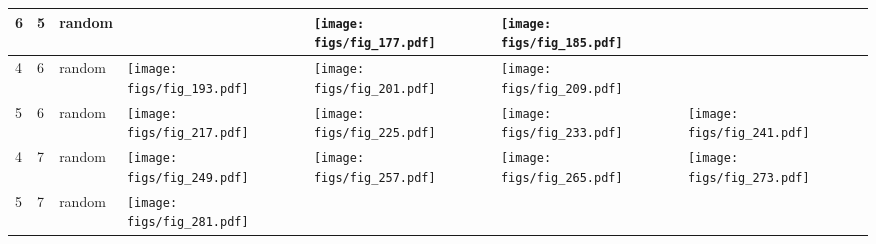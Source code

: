 \documentclass[oneside,canadian,landscape]{article}
\begin{document}
\begin{center}
\begin{longtable}{|l|l|l||l|l|l|l|}
6&5&random&&\begin{minipage}{3.5cm}
\texttt{[image: figs/fig\_177.pdf]}
\end{minipage}
&\begin{minipage}{3.5cm}
\texttt{[image: figs/fig\_185.pdf]}
\end{minipage}
&\\ \hline
4&6&random&\begin{minipage}{3.5cm}
\texttt{[image: figs/fig\_193.pdf]}
\end{minipage}
&\begin{minipage}{3.5cm}
\texttt{[image: figs/fig\_201.pdf]}
\end{minipage}
&\begin{minipage}{3.5cm}
\texttt{[image: figs/fig\_209.pdf]}
\end{minipage}
&\\ \hline
5&6&random&\begin{minipage}{3.5cm}
\texttt{[image: figs/fig\_217.pdf]}
\end{minipage}
&\begin{minipage}{3.5cm}
\texttt{[image: figs/fig\_225.pdf]}
\end{minipage}
&\begin{minipage}{3.5cm}
\texttt{[image: figs/fig\_233.pdf]}
\end{minipage}
&\begin{minipage}{3.5cm}
\texttt{[image: figs/fig\_241.pdf]}
\end{minipage}
\\ \hline
4&7&random&\begin{minipage}{3.5cm}
\texttt{[image: figs/fig\_249.pdf]}
\end{minipage}
&\begin{minipage}{3.5cm}
\texttt{[image: figs/fig\_257.pdf]}
\end{minipage}
&\begin{minipage}{3.5cm}
\texttt{[image: figs/fig\_265.pdf]}
\end{minipage}
&\begin{minipage}{3.5cm}
\texttt{[image: figs/fig\_273.pdf]}
\end{minipage}
\\ \hline
5&7&random&\begin{minipage}{3.5cm}
\texttt{[image: figs/fig\_281.pdf]}
\end{minipage}

\end{longtable}
\end{center}
\end{document}

